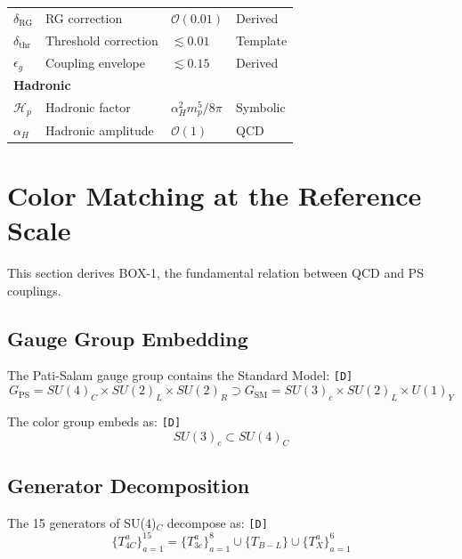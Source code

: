 \documentclass[11pt,a4paper]{article}
\newcommand{\tagD}{\textcolor{green!50!black}{\texttt{[D]}}}
\theoremstyle{definition}
\begin{document}
\begin{notationbox}
\begin{center}
\begin{longtable}{llll}
$\delta_{\text{RG}}$ & RG correction & $\mathcal{O}(0.01)$ & Derived \\
$\delta_{\text{thr}}$ & Threshold correction & $\lesssim 0.01$ & Template \\
$\epsilon_g$ & Coupling envelope & $\lesssim 0.15$ & Derived \\
\midrule
\multicolumn{4}{l}{\textbf{Hadronic}} \\
\midrule
$\mathcal{H}_p$ & Hadronic factor & $\alpha_H^2 m_p^5 / 8\pi$ & Symbolic \\
$\alpha_H$ & Hadronic amplitude & $\mathcal{O}(1)$ & QCD \\
\bottomrule
\end{longtable}
\end{center}
\end{notationbox}

\section{Color Matching at the Reference Scale}
\label{sec:color-matching}

This section derives BOX-1, the fundamental relation between QCD and PS couplings.

\subsection{Gauge Group Embedding}
\label{subsec:gauge-embedding}

The Pati-Salam gauge group contains the Standard Model: \tagD{}
\begin{equation}
\label{eq:ps-contains-sm}
G_{\text{PS}} = SU(4)_C \times SU(2)_L \times SU(2)_R \supset G_{\text{SM}} = SU(3)_c \times SU(2)_L \times U(1)_Y
\end{equation}

The color group embeds as: \tagD{}
\begin{equation}
\label{eq:su3-in-su4}
SU(3)_c \subset SU(4)_C
\end{equation}

\subsection{Generator Decomposition}
\label{subsec:generator-decomp}

The 15 generators of SU(4)$_C$ decompose as: \tagD{}
\begin{equation}
\label{eq:su4-generators}
\{T^a_{4C}\}_{a=1}^{15} = \{T^a_{3c}\}_{a=1}^{8} \cup \{T_{B-L}\} \cup \{T^a_X\}_{a=1}^{6}
\end{equation}
\end{document}
